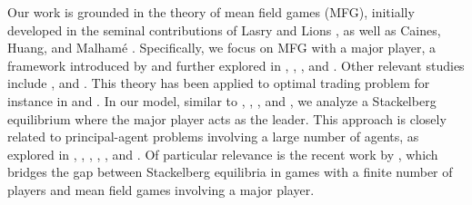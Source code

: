 \documentclass[10pt]{article}
\begin{document}
Our work is grounded in the theory of mean field games (MFG), initially developed in the seminal contributions of Lasry and Lions \cite{lasry2006jeux, lasry2006jeuxii, lasry2007mean}, as well as Caines, Huang, and Malhamé \cite{huang2006large, huang2007large, huang2007invariance}. Specifically, we focus on MFG with a major player, a framework introduced by \citeauthor{huang2010large} \cite{huang2010large} and further explored in \citeauthor{bensoussan2016mean} \cite{bensoussan2016mean}, \citeauthor{carmona2017alternative} \cite{carmona2017alternative}, \citeauthor{carmona2016probabilistic} \cite{carmona2016probabilistic}, and \citeauthor{nourian2013eps} \cite{nourian2013eps}. Other relevant studies include \citeauthor{bertucci2020strategic} \cite{bertucci2020strategic}, and \citeauthor{cardaliaguet2020remarks} \cite{cardaliaguet2020remarks}. This theory has been applied to optimal trading problem for instance in \citeauthor{cardaliaguet2018mean} \cite{cardaliaguet2018mean} and \citeauthor{carmona2015probabilistic} \cite{carmona2015probabilistic}. In our model, similar to \citeauthor{bensoussan2016mean} \cite{bensoussan2016mean}, \citeauthor{guo2022optimization} \cite{guo2022optimization}, \citeauthor{moon2018linear} \cite{moon2018linear}, and \citeauthor{nguyen2012mean} \cite{nguyen2012mean}, we analyze a Stackelberg equilibrium where the major player acts as the leader. This approach is closely related to principal-agent problems involving a large number of agents, as explored in \citeauthor{carmona2017alternative} \cite{carmona2017alternative}, \citeauthor{elie2019tale} \cite{elie2019tale}, \citeauthor{elie2019contracting} \cite{elie2019contracting}, \citeauthor{elie2021mean} \cite{elie2021mean}, \citeauthor{hubert2023continuous} \cite{hubert2023continuous}, and \citeauthor{nutz2019mean} \cite{nutz2019mean}. Of particular relevance is the recent work by \citeauthor{djete2023stackelberg} \cite{djete2023stackelberg}, which bridges the gap between Stackelberg equilibria in games with a finite number of players and mean field games involving a major player.\\
\end{document}
